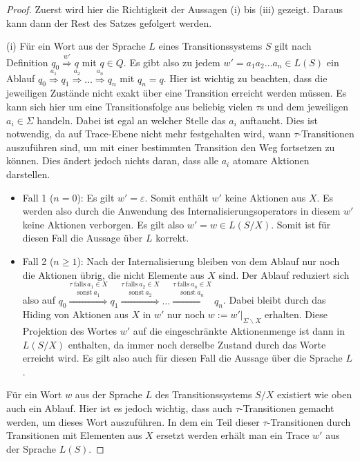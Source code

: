 \begin{proof}
  Zuerst wird hier die Richtigkeit der Aussagen (i) bis (iii) gezeigt. Daraus
  kann dann der Rest des Satzes gefolgert werden.

  (i)
  Für ein Wort aus der Sprache $L$ eines Transitionssystems $S$ gilt nach
  Definition $q_0 \overset{w'}{\Rightarrow} q$ mit $q\in Q$. Es gibt also zu
  jedem $w' = a_1a_2\dots a_n\in L(S)$ ein Ablauf $q_0
  \overset{a_1}{\Rightarrow} q_1 \overset{a_2}{\Rightarrow} \dots
  \overset{a_n}{\Rightarrow} q_n$ mit $q_n=q$. Hier ist wichtig zu beachten,
  dass die jeweiligen Zustände nicht exakt über eine Transition erreicht werden
  müssen. Es kann sich hier um eine Transitionsfolge aus beliebig vielen
  $\tau$s und dem jeweiligen $a_i\in\Sigma$ handeln. Dabei ist egal an welcher
  Stelle das $a_i$ auftaucht. Dies ist notwendig, da auf Trace-Ebene nicht mehr
  festgehalten wird, wann $\tau$-Transitionen auszuführen sind, um mit einer
  bestimmten Transition den Weg fortsetzen zu können. Dies ändert jedoch nichts
  daran, dass alle $a_i$ atomare Aktionen darstellen.
  \begin{itemize}
    \item Fall 1 ($n=0$): Es gilt $w'=\varepsilon$. Somit enthält $w'$ keine
      Aktionen aus $X$. Es werden also durch die Anwendung des
      Internalisierungsoperators in diesem $w'$ keine Aktionen verborgen. Es
      gilt also $w'=w\in L(S/X)$. Somit ist für diesen Fall die Aussage über
      $L$ korrekt.
    \item Fall 2 ($n\geq 1$): Nach der Internalisierung bleiben von dem Ablauf
      nur noch die Aktionen übrig, die nicht Elemente aus $X$ sind. Der Ablauf
      reduziert sich also auf $q_0 \overset{\tau~\mathrm{falls}~a_1\in
      X}{\overset{\mathrm{sonst}~a_1}{\Longrightarrow}} q_1
      \overset{\tau~\mathrm{falls}~a_2\in
      X}{\overset{\mathrm{sonst}~a_2}{\Longrightarrow}} \dots
      \overset{\tau~\mathrm{falls}~a_n\in
      X}{\overset{\mathrm{sonst}~a_n}{\Longrightarrow}} q_n$. Dabei bleibt
      durch das Hiding von Aktionen aus $X$ in $w'$ nur noch
      $w:=w'|_{\Sigma\backslash X}$ erhalten. Diese Projektion des Wortes
      $w'$ auf die eingeschränkte Aktionenmenge ist dann in $L(S/X)$ enthalten,
      da immer noch derselbe Zustand durch das Worte erreicht wird. Es gilt
      also auch für diesen Fall die Aussage über die Sprache $L$.
  \end{itemize}
  Für ein Wort $w$ aus der Sprache $L$ des Transitionssystems $S/X$ existiert
  wie oben auch ein Ablauf. Hier ist es jedoch wichtig, dass auch
  $\tau$-Transitionen gemacht werden, um dieses Wort auszuführen. In dem ein
  Teil dieser $\tau$-Transitionen durch Transitionen mit Elementen aus $X$
  ersetzt werden erhält man ein Trace $w'$ aus der Sprache $L(S)$.


\end{proof}

